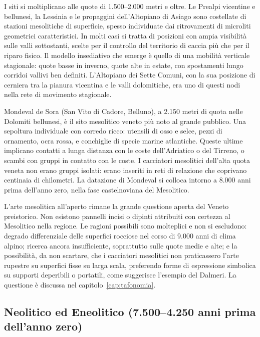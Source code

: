 I siti si moltiplicano alle quote di 1.500--2.000 metri e oltre. Le Prealpi vicentine e bellunesi, la Lessinia e le propaggini dell'Altopiano di Asiago sono costellate di stazioni mesolitiche di superficie, spesso individuate dai ritrovamenti di microliti geometrici caratteristici. In molti casi si tratta di posizioni con ampia visibilità sulle valli sottostanti, scelte per il controllo del territorio di caccia più che per il riparo fisico. Il modello insediativo che emerge è quello di una mobilità verticale stagionale: quote basse in inverno, quote alte in estate, con spostamenti lungo corridoi vallivi ben definiti. L'Altopiano dei Sette Comuni, con la sua posizione di cerniera tra la pianura vicentina e le valli dolomitiche, era uno di questi nodi nella rete di movimento stagionale.

Mondeval de Sora (San Vito di Cadore, Belluno), a 2.150 metri di quota nelle Dolomiti bellunesi, è il sito mesolitico veneto più noto al grande pubblico. Una sepoltura individuale con corredo ricco: utensili di osso e selce, pezzi di ornamento, ocra rossa, e conchiglie di specie marine atlantiche. Queste ultime implicano contatti a lunga distanza con le coste dell'Adriatico o del Tirreno, o scambi con gruppi in contatto con le coste. I cacciatori mesolitici dell'alta quota veneta non erano gruppi isolati: erano inseriti in reti di relazione che coprivano centinaia di chilometri. La datazione di Mondeval si colloca intorno a 8.000 anni prima dell'anno zero, nella fase castelnoviana del Mesolitico.

L'arte mesolitica all'aperto rimane la grande questione aperta del Veneto preistorico. Non esistono pannelli incisi o dipinti attribuiti con certezza al Mesolitico nella regione. Le ragioni possibili sono molteplici e non si escludono: degrado differenziale delle superfici rocciose nel corso di 9.000 anni di clima alpino; ricerca ancora insufficiente, soprattutto sulle quote medie e alte; e la possibilità, da non scartare, che i cacciatori mesolitici non praticassero l'arte rupestre su superfici fisse su larga scala, preferendo forme di espressione simbolica su supporti deperibili o portatili, come suggerisce l'esempio del Dalmeri. La questione è discussa nel capitolo~\ref{cap:tafonomia}.

\subsection{Neolitico ed Eneolitico (7.500--4.250 anni prima dell'anno zero)}

